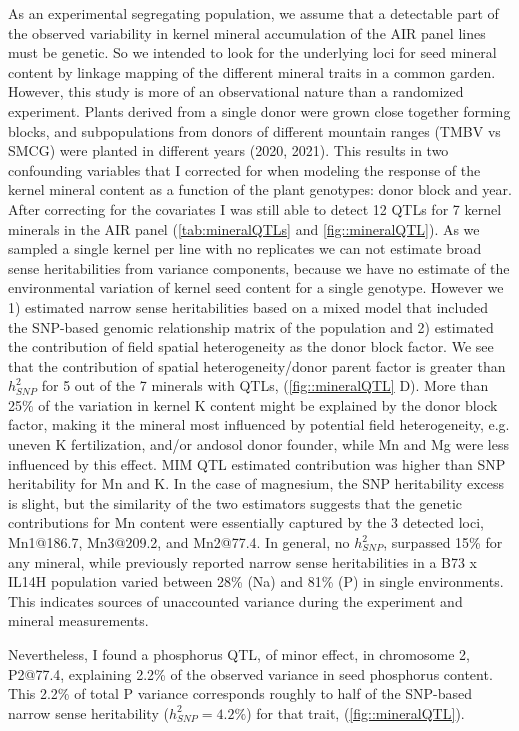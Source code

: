 As an experimental segregating population, we assume that a detectable part of the observed variability in kernel mineral accumulation of the AIR panel lines must be genetic.
So we intended to look for the underlying loci for seed mineral content by linkage mapping of the different mineral traits in a common garden.
However, this study is more of an observational nature than a randomized experiment. 
Plants derived from a single donor were grown close together forming blocks, and subpopulations from donors of different mountain ranges (TMBV vs SMCG) were planted in different years (2020, 2021). 
This results in two confounding variables that I corrected for when modeling the response of the kernel mineral content as a function of the plant genotypes: donor block and year. 
After correcting for the covariates I was still able to detect 12 QTLs for 7 kernel minerals in the AIR panel (\autoref{tab:mineralQTLs} and \autoref{fig::mineralQTL}).
As we sampled a single kernel per line with no replicates we can not estimate broad sense heritabilities from variance components, because we have no estimate of the environmental variation of kernel seed content for a single genotype.
However we 1) estimated narrow sense heritabilities based on a mixed model that included the SNP-based genomic relationship matrix of the population and 2) estimated the contribution of field spatial heterogeneity as the donor block factor.
We see that the contribution of spatial heterogeneity/donor parent factor is greater than $h_{SNP}^2$ for 5 out of the 7 minerals with QTLs, (\autoref{fig::mineralQTL} D). 
More than 25\% of the variation in kernel K content might be explained  by the donor block factor, making it the mineral most influenced by potential field heterogeneity, e.g. uneven K fertilization, and/or andosol donor founder, while Mn and Mg were less influenced by this effect.
MIM QTL estimated contribution was higher than SNP heritability for Mn and K. 
In the case of magnesium, the SNP heritability excess is slight, but the similarity of the two estimators suggests that the genetic contributions for Mn content were essentially captured by the 3 detected loci, Mn1@186.7, Mn3@209.2, and Mn2@77.4. 
In general, no $h_{SNP}^2$, surpassed 15\% for any mineral, while previously reported narrow sense heritabilities in a B73 x IL14H population varied between 28\% (Na) and 81\% (P) \citep{baxter2014} in single environments.  
This indicates sources of unaccounted variance during the experiment and mineral measurements.

Nevertheless, I found a phosphorus QTL, of minor effect, in chromosome 2, P2@77.4, explaining 2.2\% of the observed variance in seed phosphorus content. 
This 2.2\% of total P variance corresponds roughly to half of the SNP-based narrow sense heritability ($h_{SNP}^2=4.2\%$) for that trait, (\autoref{fig::mineralQTL}).

